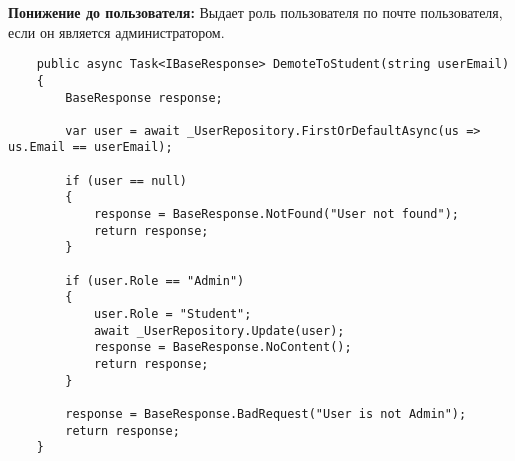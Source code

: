 \textbf{Понижение до пользователя:} Выдает роль пользователя по почте пользователя, если он является администратором.
\begin{verbatim}
    public async Task<IBaseResponse> DemoteToStudent(string userEmail)
    {
        BaseResponse response;

        var user = await _UserRepository.FirstOrDefaultAsync(us => us.Email == userEmail);

        if (user == null)
        {
            response = BaseResponse.NotFound("User not found");
            return response;
        }

        if (user.Role == "Admin")
        {
            user.Role = "Student";
            await _UserRepository.Update(user);
            response = BaseResponse.NoContent();
            return response;
        }

        response = BaseResponse.BadRequest("User is not Admin");
        return response;
    }
\end{verbatim}
